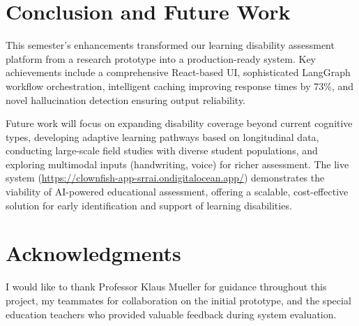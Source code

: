 \documentclass[11pt]{article}
\begin{document}
\section{Conclusion and Future Work}

This semester's enhancements transformed our learning disability assessment platform from a research prototype into a production-ready system. Key achievements include a comprehensive React-based UI, sophisticated LangGraph workflow orchestration, intelligent caching improving response times by 73\%, and novel hallucination detection ensuring output reliability.

Future work will focus on expanding disability coverage beyond current cognitive types, developing adaptive learning pathways based on longitudinal data, conducting large-scale field studies with diverse student populations, and exploring multimodal inputs (handwriting, voice) for richer assessment. The live system (\url{https://clownfish-app-srrai.ondigitalocean.app/}) demonstrates the viability of AI-powered educational assessment, offering a scalable, cost-effective solution for early identification and support of learning disabilities.

\section*{Acknowledgments}

I would like to thank Professor Klaus Mueller for guidance throughout this project, my teammates for collaboration on the initial prototype, and the special education teachers who provided valuable feedback during system evaluation.
\end{document}
